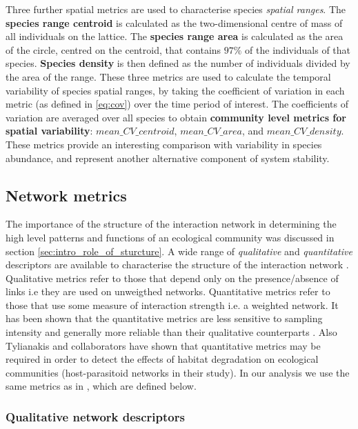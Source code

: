Three further spatial metrics are used to characterise species \emph{spatial ranges}. The \textbf{species range centroid} is calculated as the two-dimensional centre of mass of all individuals on the lattice. The \textbf{species range area} is calculated as the area of the circle, centred on the centroid, that contains $97\%$ of the individuals of that species. \textbf{Species density} is then defined as the number of individuals divided by the area of the range. These three metrics are used to calculate the temporal variability of species spatial ranges, by taking the coefficient of variation in each metric (as defined in \eqref{eq:cov}) over the time period of interest. The coefficients of variation are averaged over all species to obtain \textbf{community level metrics for spatial variability}: $mean\_CV\_centroid$, $mean\_CV\_area$, and $mean\_CV\_density$. These metrics provide an interesting comparison with variability in species abundance, and represent another alternative component of system stability.


\subsection{Network metrics}
\label{sec:define_network_metrics}

The importance of the structure of the interaction network in determining the high level patterns and functions of an ecological community was discussed in section \ref{sec:intro_role_of_sturcture}. A wide range of \emph{qualitative} and \emph{quantitative} descriptors are available to characterise the structure of the interaction network \cite{bluthgen2008interaction, lurgi2015effects, tylianakis2007habitat,bersier2002quantitative}. Qualitative metrics refer to those that depend only on the presence/absence of links i.e they are used on unweigthed networks. Quantitative metrics refer to those that use some measure of interaction strength i.e. a weighted network. It has been shown that the quantitative metrics are less sensitive to sampling intensity and generally more reliable than their qualitative counterparts \cite{banavsek2004sampling, bluthgen2006measuring}. Also Tylianakis and collaborators have shown \cite{tylianakis2007habitat} that quantitative metrics may be required in order to detect the effects of habitat degradation on ecological communities (host-parasitoid networks in their study). In our analysis we use the same metrics as in \cite{lurgi2015effects}, which are defined below.


\subsubsection{Qualitative network descriptors}
\label{sec:def_qual_metrics}

